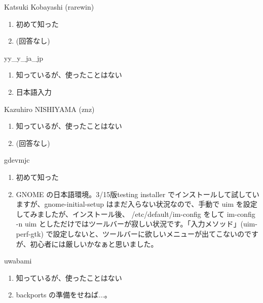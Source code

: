 \begin{prework}{ Katsuki Kobayashi (rarewin) }
  \begin{enumerate}
  \item 初めて知った
  \item (回答なし)
  \end{enumerate}
\end{prework}

\begin{prework}{ yy\_y\_ja\_jp }
  \begin{enumerate}
  \item 知っているが、使ったことはない
  \item 日本語入力
  \end{enumerate}
\end{prework}

\begin{prework}{ Kazuhiro NISHIYAMA (znz) }
  \begin{enumerate}
  \item 知っているが、使ったことはない
  \item (回答なし)
  \end{enumerate}
\end{prework}

\begin{prework}{ gdevmjc }
  \begin{enumerate}
  \item 初めて知った
  \item GNOME の日本語環境。3/15版testing installer でインストールして試していますが、gnome-initial-setup はまだ入らない状況なので、手動で uim を設定してみましたが、インストール後、 /etc/default/im-config をして im-config -n uim としただけではツールバーが寂しい状況です。「入力メソッド」(uim-perf-gtk) で設定しないと、ツールバーに欲しいメニューが出てこないのですが、初心者には厳しいかなぁと思いました。
  \end{enumerate}
\end{prework}

\begin{prework}{ uwabami }
  \begin{enumerate}
  \item 知っているが、使ったことはない
  \item backports の準備をせねば...。
  \end{enumerate}
\end{prework}
